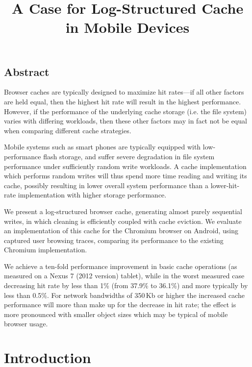 \documentclass[letterpaper,twocolumn,10pt]{article}
\begin{document}
\title{\Large \bf A Case for Log-Structured Cache in Mobile Devices}

\date{}
\maketitle

\thispagestyle{empty}

\subsection*{Abstract}
Browser caches are typically designed to maximize hit rates---if all other
factors are held equal, then the highest hit rate will result in the highest
performance. However, if the performance of the underlying cache storage
(i.e. the file system) varies with differing workloads, then these other factors
may in fact not be equal when comparing different cache strategies.

Mobile systems such as smart phones are typically equipped with low-performance flash
storage, and suffer severe degradation in file system performance under
sufficiently random write workloads. A cache implementation which performs
random writes will thus spend more time reading and writing its cache, possibly
resulting in lower overall system performance than a lower-hit-rate
implementation with higher storage performance.

We present a log-structured browser cache, generating almost purely sequential
writes, in which cleaning is efficiently coupled with cache
eviction. We evaluate an
implementation of this cache for the Chromium browser on Android, using
captured user browsing traces, comparing 
its performance to the existing Chromium implementation.

We achieve a ten-fold performance improvement in basic cache operations (as
measured on a Nexus 7 (2012 version) tablet), while in the worst measured case
decreasing hit rate by less than 1\% (from 37.9\% to 36.1\%) and more
typically by less than 0.5\%. For network
bandwidths of 350\,Kb or higher the increased cache performance will
more than make up for the decrease in hit rate; the effect is more
pronounced with smaller object sizes which may be typical of mobile
browser usage.

\section{Introduction}
\end{document}
